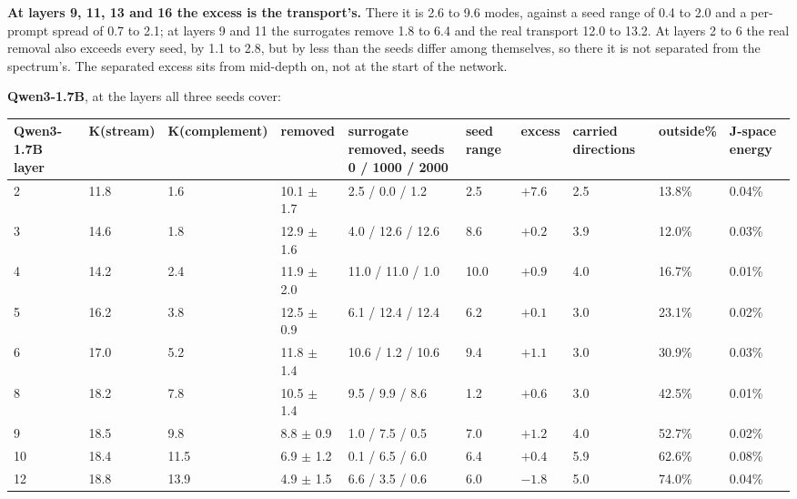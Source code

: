 \documentclass[10pt,letterpaper,twocolumn]{article}
\begin{document}
\textbf{At layers 9, 11, 13 and 16 the excess is the transport's.} There it is 2.6 to 9.6 modes,
against a seed range of 0.4 to 2.0 and a per-prompt spread of 0.7 to 2.1; at layers 9 and 11 the
surrogates remove 1.8 to 6.4 and the real transport 12.0 to 13.2. At layers 2 to 6 the real removal
also exceeds every seed, by 1.1 to 2.8, but by less than the seeds differ among themselves, so there
it is not separated from the spectrum's. The separated excess sits from mid-depth on, not at the
start of the network.

\textbf{Qwen3-1.7B}, at the layers all three seeds cover:

\begin{table}[tp]
\centering\footnotesize
\begin{tabular}{L{0.083\textwidth}L{0.075\textwidth}L{0.108\textwidth}L{0.076\textwidth}L{0.155\textwidth}L{0.071\textwidth}L{0.050\textwidth}L{0.084\textwidth}L{0.067\textwidth}L{0.064\textwidth}}
\toprule
Qwen3-1.7B layer & K(stream) & K(complement) & removed & surrogate removed, seeds 0 / 1000 / 2000 & seed range & excess & carried directions & outside\% & J-space energy \\
 & 11.8 & 1.6 & 10.1 \(\pm\) 1.7 & 2.5 / 0.0 / 1.2 & 2.5 & \(+7.6\) & 2.5 & 13.8\% & 0.04\% \\
3 & 14.6 & 1.8 & 12.9 \(\pm\) 1.6 & 4.0 / 12.6 / 12.6 & 8.6 & \(+0.2\) & 3.9 & 12.0\% & 0.03\% \\
4 & 14.2 & 2.4 & 11.9 \(\pm\) 2.0 & 11.0 / 11.0 / 1.0 & 10.0 & \(+0.9\) & 4.0 & 16.7\% & 0.01\% \\
5 & 16.2 & 3.8 & 12.5 \(\pm\) 0.9 & 6.1 / 12.4 / 12.4 & 6.2 & \(+0.1\) & 3.0 & 23.1\% & 0.02\% \\
6 & 17.0 & 5.2 & 11.8 \(\pm\) 1.4 & 10.6 / 1.2 / 10.6 & 9.4 & \(+1.1\) & 3.0 & 30.9\% & 0.03\% \\
8 & 18.2 & 7.8 & 10.5 \(\pm\) 1.4 & 9.5 / 9.9 / 8.6 & 1.2 & \(+0.6\) & 3.0 & 42.5\% & 0.01\% \\
9 & 18.5 & 9.8 & 8.8 \(\pm\) 0.9 & 1.0 / 7.5 / 0.5 & 7.0 & \(+1.2\) & 4.0 & 52.7\% & 0.02\% \\
10 & 18.4 & 11.5 & 6.9 \(\pm\) 1.2 & 0.1 / 6.5 / 6.0 & 6.4 & \(+0.4\) & 5.9 & 62.6\% & 0.08\% \\
12 & 18.8 & 13.9 & 4.9 \(\pm\) 1.5 & 6.6 / 3.5 / 0.6 & 6.0 & \(-1.8\) & 5.0 & 74.0\% & 0.04\% \\
\bottomrule
\end{tabular}
\end{table}
\end{document}
